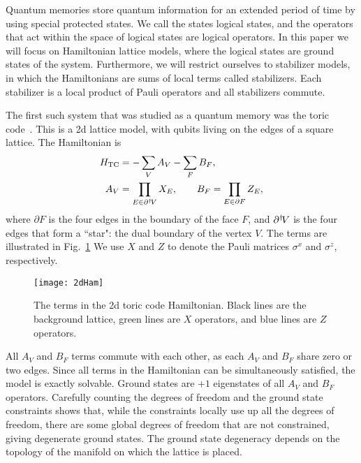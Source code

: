 Quantum memories store quantum information for an extended period of time by using special protected states. We call the states logical states, and the operators that act within the space of logical states are logical operators. 
In this paper we will focus on Hamiltonian lattice models, where the logical states are ground states of the system. Furthermore, we will restrict ourselves to stabilizer models, in which the Hamiltonians are sums of local terms called stabilizers.
Each stabilizer is a local product of Pauli operators and all stabilizers commute. 

The first such system that was studied as a quantum memory was the toric code~\cite{Kitaev2003Fault}. This is a 2d lattice model, with qubits living on the edges of a square lattice. The Hamiltonian is 
\begin{align}
\begin{aligned}
H_\text{TC} &= -\sum_V A_V - \sum_F B_F,\\
A_V &= \prod_{E\in\partial^\dagger\! V} X_E,\qquad B_F = \prod_{E \in \partial F} Z_E, \label{eq:HTC}
\end{aligned}
\end{align}
where $\partial F$ is the four edges in the boundary of the face $F$, and $\partial^\dagger\! V$ is the four edges that form a ``star": the dual boundary of the vertex $V$. The terms are illustrated in Fig.~\ref{fig:2dHam}  We use $X$ and $Z$ to denote the Pauli matrices $\sigma^x$ and $\sigma^z$, respectively.

\begin{figure}
    \centering
    \texttt{[image: 2dHam]}
    \caption[The terms in the 2d toric code Hamiltonian]{The terms in the 2d toric code Hamiltonian. Black lines are the background lattice, green lines are $X$ operators, and blue lines are $Z$ operators.}
    \label{fig:2dHam}
\end{figure}

All $A_V$ and $B_F$ terms commute with each other, as each $A_V$ and $B_F$ share zero or two edges. Since all terms in the Hamiltonian can be simultaneously satisfied, the model is exactly solvable. Ground states are $+1$ eigenstates of all $A_V$ and $B_F$ operators. Carefully counting the degrees of freedom and the ground state constraints shows that, while the constraints locally use up all the degrees of freedom, there are some global degrees of freedom that are not constrained, giving degenerate ground states.
The ground state degeneracy depends on the topology of the manifold on which the lattice is placed. 

